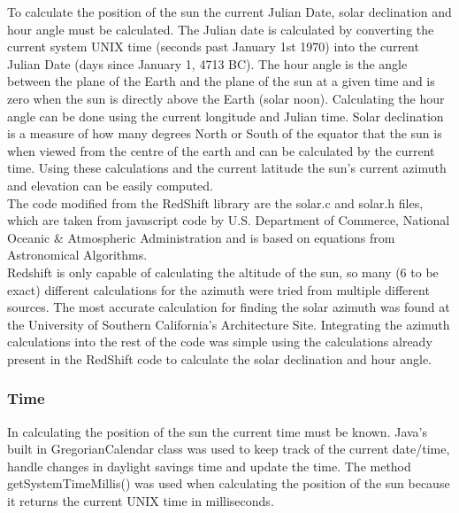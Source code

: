\documentclass[12pt]{report}
\begin{document}
To calculate the position of the sun the current Julian Date, solar declination and hour angle must be calculated. The Julian date is calculated by converting the current system UNIX time (seconds past January 1st 1970) into the current Julian Date (days since January 1, 4713 BC).
The hour angle is the angle between the plane of the Earth and the plane of the sun at a given time and is zero when the sun is directly above the Earth (solar noon). Calculating the hour angle can be done using the current longitude and Julian time. Solar declination is a measure of how many degrees North or South of the equator that the sun is when viewed from the centre of the earth and can be calculated by the current time. Using these calculations and the current latitude the sun's current azimuth and elevation can be easily computed.\\

The code modified from the RedShift library are the solar.c and solar.h files, which are taken from javascript code by U.S. Department of Commerce, National Oceanic \& Atmospheric Administration\cite{usnoaa} and is based on equations from Astronomical Algorithms\cite{astronomicalalgorithms}. \\

Redshift is only capable of calculating the altitude of the sun, so many (6 to be exact) different calculations for the azimuth were tried from multiple different sources. The most accurate calculation for finding the solar azimuth was found at the University of Southern California's Architecture Site\cite{solarazi}. Integrating the azimuth calculations into the rest of the code was simple using the calculations already present in the RedShift code to calculate the solar declination and hour angle.\\

\subsubsection{Time}
In calculating the position of the sun the current time must be known. Java's built in GregorianCalendar class was used to keep track of the current date/time, handle changes in daylight savings time and update the time. The method getSystemTimeMillis() was used when calculating the position of the sun because it returns the current UNIX time in milliseconds.\\
\end{document}
